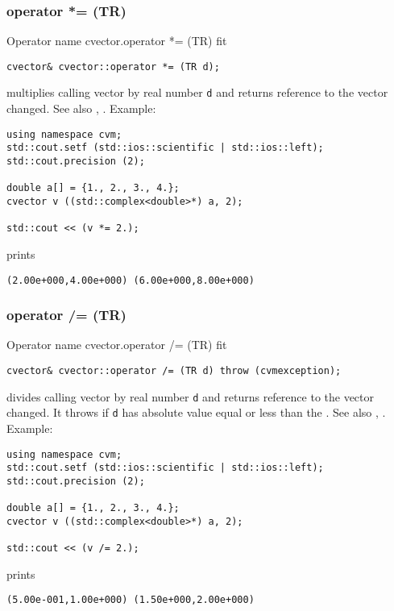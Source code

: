 \subsubsection{operator *= (TR)}
Operator%
\pdfdest name {cvector.operator *= (TR)} fit
\begin{verbatim}
cvector& cvector::operator *= (TR d);
\end{verbatim}
multiplies  calling vector by real number \verb"d"
and returns  reference to
the vector changed.
See also ,
.
Example:
\begin{Verbatim}
using namespace cvm;
std::cout.setf (std::ios::scientific | std::ios::left);
std::cout.precision (2);

double a[] = {1., 2., 3., 4.};
cvector v ((std::complex<double>*) a, 2);

std::cout << (v *= 2.);
\end{Verbatim}
prints
\begin{Verbatim}
(2.00e+000,4.00e+000) (6.00e+000,8.00e+000)
\end{Verbatim}
\newpage



\subsubsection{operator /= (TR)}
Operator%
\pdfdest name {cvector.operator /= (TR)} fit
\begin{verbatim}
cvector& cvector::operator /= (TR d) throw (cvmexception);
\end{verbatim}
divides  calling vector by real number \verb"d"
and returns  reference to
the vector changed.
It throws  
if \verb"d" has  absolute value equal or less
than the
.
See also ,
.
Example:
\begin{Verbatim}
using namespace cvm;
std::cout.setf (std::ios::scientific | std::ios::left);
std::cout.precision (2);

double a[] = {1., 2., 3., 4.};
cvector v ((std::complex<double>*) a, 2);

std::cout << (v /= 2.);
\end{Verbatim}
prints
\begin{Verbatim}
(5.00e-001,1.00e+000) (1.50e+000,2.00e+000)
\end{Verbatim}
\newpage



